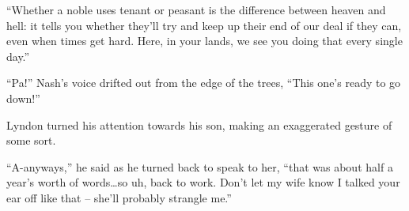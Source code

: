  

“Whether a noble uses tenant or peasant is the difference between heaven and hell: it tells you whether they’ll try and keep up their end of our deal if they can, even when times get hard. Here, in your lands, we see you doing that every single day.”

 

“Pa!” Nash’s voice drifted out from the edge of the trees, “This one’s ready to go down!”

 

Lyndon turned his attention towards his son, making an exaggerated gesture of some sort.

 

“A-anyways,” he said as he turned back to speak to her, “that was about half a year’s worth of words…so uh, back to work. Don’t let my wife know I talked your ear off like that – she’ll probably strangle me.”

